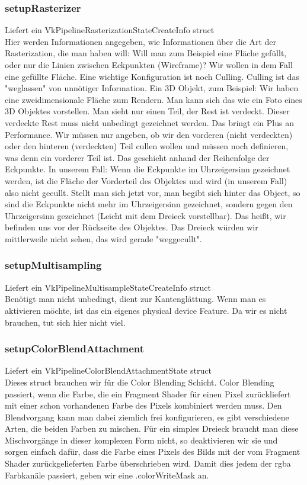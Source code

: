 \documentclass[11pt,a4paper]{report}
\begin{document}
\subsubsection{setupRasterizer}
Liefert ein VkPipelineRasterizationStateCreateInfo struct\\
Hier werden Informationen angegeben, wie Informationen über die Art der Rasterization, die man haben will: Will man zum Beispiel eine Fläche gefüllt, oder nur die Linien zwischen Eckpunkten (Wireframe)? Wir wollen in dem Fall eine gefüllte Fläche. Eine wichtige Konfiguration ist noch Culling. Culling ist das "weglassen" von unnötiger Information. Ein 3D Objekt, zum Beispiel: Wir haben eine zweidimensionale Fläche zum Rendern. Man kann sich das wie ein Foto eines 3D Objektes vorstellen. Man sieht nur einen Teil, der Rest ist verdeckt. Dieser verdeckte Rest muss nicht unbedingt gezeichnet werden. Das bringt ein Plus an Performance. Wir müssen nur angeben, ob wir den vorderen (nicht verdeckten) oder den hinteren (verdeckten) Teil cullen wollen und müssen noch definieren, was denn ein vorderer Teil ist. Das geschieht anhand der Reihenfolge der Eckpunkte. In unserem Fall: Wenn die Eckpunkte im Uhrzeigersinn gezeichnet werden, ist die Fläche der Vorderteil des Objektes und wird (in unserem Fall) also nicht gecullt. Stellt man sich jetzt vor, man begibt sich hinter das Object, so sind die Eckpunkte nicht mehr im Uhrzeigersinn gezeichnet, sondern gegen den Uhrzeigersinn gezeichnet (Leicht mit dem Dreieck vorstellbar). Das heißt, wir befinden uns vor der Rückseite des Objektes. Das Dreieck würden wir mittlerweile nicht sehen, das wird gerade "weggecullt".

\subsubsection{setupMultisampling}
Liefert ein VkPipelineMultisampleStateCreateInfo struct\\
Benötigt man nicht unbedingt, dient zur Kantenglättung. Wenn man es aktivieren möchte, ist das ein eigenes physical device Feature. Da wir es nicht brauchen, tut sich hier nicht viel.

\subsubsection{setupColorBlendAttachment}
Liefert ein VkPipelineColorBlendAttachmentState struct\\
Dieses struct brauchen wir für die Color Blending Schicht. Color Blending passiert, wenn die Farbe, die ein Fragment Shader für einen Pixel zurückliefert mit einer schon vorhandenen Farbe des Pixels kombiniert werden muss. Den Blendvorgang kann man dabei ziemlich frei konfigurieren, es gibt verschiedene Arten, die beiden Farben zu mischen. Für ein simples Dreieck braucht man diese Mischvorgänge in dieser komplexen Form nicht, so deaktivieren wir sie und sorgen einfach dafür, dass die Farbe eines Pixels des Bilds mit der vom Fragment Shader zurückgelieferten Farbe überschrieben wird. Damit dies jedem der rgba Farbkanäle passiert, geben wir eine .colorWriteMask an.
\end{document}

